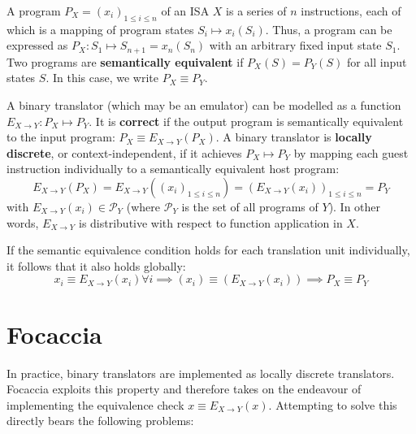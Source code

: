 A program $P_X = (x_i)_{1 \leq i \leq n}$ of an \ac{ISA} $X$ is a series of $n$ instructions, each of which is a mapping
of program states $S_i \mapsto x_i(S_i)$. Thus, a program can be expressed as
    $P_X : S_1 \mapsto S_{n+1} = x_n(S_n)$
with an arbitrary fixed input state $S_1$. Two programs are \textbf{semantically equivalent} if $P_X(S) = P_Y(S)$ for
all input states $S$. In this case, we write $P_X \equiv P_Y$.

A binary translator (which may be an emulator) can be modelled as a function $E_{X \rightarrow Y}: P_X \mapsto P_Y$. It
is \textbf{correct} if the output program is semantically equivalent to the input program:
    $P_X \equiv E_{X \rightarrow Y}(P_X)$.
A binary translator is \textbf{locally discrete}, or context-independent, if it achieves $P_X \mapsto P_Y$ by mapping
each guest instruction individually to a semantically equivalent host program:
\begin{equation}\label{sem_eq}
    E_{X\rightarrow Y}(P_X) = E_{X \rightarrow Y}((x_i)_{1 \leq i \leq n}) = (E_{X \rightarrow Y}(x_i))_{1 \leq i \leq n} = P_Y
\end{equation}
with $E_{X\rightarrow Y}(x_i) \in \mathcal{P}_Y$ (where $\mathcal{P}_Y$ is the set of all programs of $Y$). In other
words, $E_{X\rightarrow Y}$ is distributive with respect to function application in $X$.

If the semantic equivalence condition holds for each translation unit individually, it follows that it also holds globally:
\begin{equation}
    x_i \equiv E_{X\rightarrow Y}(x_i) \forall i \implies (x_i) \equiv (E_{X\rightarrow Y}(x_i)) \implies P_X \equiv P_Y
\end{equation}

\section{Focaccia}\label{sec:intro:focaccia}

In practice, binary translators are implemented as locally discrete translators. Focaccia exploits this property and
therefore takes on the endeavour of implementing the equivalence check $x \equiv E_{X \rightarrow Y}(x)$. Attempting to
solve this directly bears the following problems:

